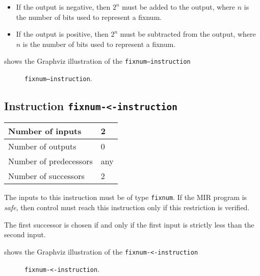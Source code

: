 \begin{itemize}
\item If the output is negative, then $2^n$ must be added to the
  output, where $n$ is the number of bits used to represent a fixnum. 
\item If the output is positive, then $2^n$ must be subtracted from
  the output, where $n$ is the number of bits used to represent a
  fixnum.
\end{itemize}

 shows the Graphviz illustration of the
\texttt{fixnum---instruction}

\begin{figure}
\begin{center}
\end{center}
\caption{\label{fig-fixnum---instruction}
\texttt{fixnum---instruction}.}
\end{figure}

\subsection{Instruction \texttt{fixnum-<-instruction}}
\label{mir-instruction-fixnum-less}

\begin{tabular}{|l|l|}
\hline
Number of inputs & 2\\
\hline
Number of outputs & 0\\
\hline
Number of predecessors & any\\
\hline
Number of successors & 2\\
\hline
\end{tabular}

The inputs to this instruction must be of type \texttt{fixnum}.  If the
MIR program is \emph{safe}, then control must reach this instruction
only if this restriction is verified.

The first successor is chosen if and only if the first input is
strictly less than the second input.

 shows the Graphviz illustration of the
\texttt{fixnum-<-instruction}

\begin{figure}
\begin{center}
\end{center}
\caption{\label{fig-fixnum-less-instruction}
\texttt{fixnum-<-instruction}.}
\end{figure}

